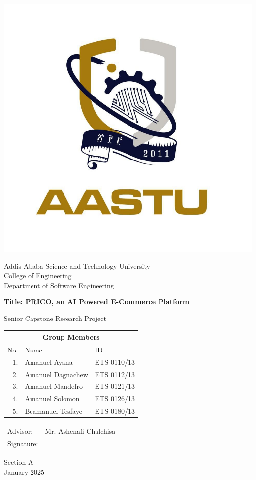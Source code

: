 \documentclass[12pt]{report}
\begin{document}
\begin{titlepage}
	\setlength{\parskip}{0pt}
	\singlespacing
	\begin{center}
		\includegraphics[width=0.4\linewidth]{aastu}

		\Large
		Addis Ababa Science and Technology University \\
		College of Engineering \\
		Department of Software Engineering

		\vspace*{1cm}

		\Large
		\textbf{Title: PRICO, an AI Powered E-Commerce Platform}

		\vspace{0.25cm}

		\Large
		Senior Capstone Research Project

		\vspace{1.25cm}

		\Large
		\begin{tabular}{|r|l|l|}
			\hline
			\multicolumn{3}{|c|}{\textbf{Group Members}} \\
			\hline
			No. & Name              & ID                 \\
			\hline
			1.  & Amanuel Ayana     & ETS 0110/13        \\
			2.  & Amanuel Dagnachew & ETS 0112/13        \\
			3.  & Amanuel Mandefro  & ETS 0121/13        \\
			4.  & Amanuel Solomon   & ETS 0126/13        \\
			5.  & Beamanuel Tesfaye & ETS 0180/13        \\
			\hline
		\end{tabular}


		\vfill

		\Large
		\begin{tabular}{@{}p{1in}p{2.4in}@{}}
			Advisor:   & Mr. Ashenafi Chalchisa \\\cline{2-2}
			Signature: &                        \\\cline{2-2}
		\end{tabular}

		\vspace{1.25cm}
		Section A\\
		January 2025
	\end{center}
\end{titlepage}
\newpage
\end{document}
